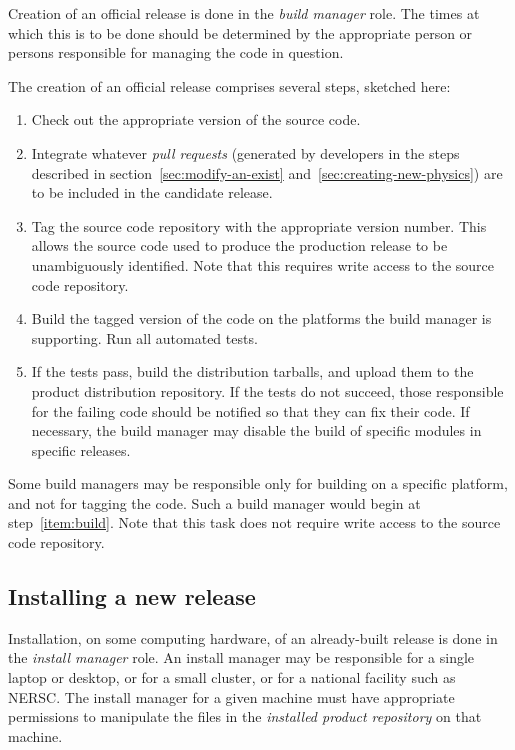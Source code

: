 \documentclass{memarticle}
\begin{document}
Creation of an official release is done in the \emph{build manager}
role. The times at which this is to be done should be determined by the
appropriate person or persons responsible for managing the code in
question.

The creation of an official release comprises several steps, sketched
here:
\begin{enumerate}
\item Check out the appropriate version of the source code.
\item Integrate whatever \emph{pull requests} (generated by developers
  in the steps described in
  section~\ref{sec:modify-an-exist}
  and~\ref{sec:creating-new-physics}) are to be included in the
  candidate release.
\item Tag the source code repository with the appropriate version
  number. This allows the source code used to produce the production
  release to be unambiguously identified. Note that this requires write
  access to the source code repository.
\item \label{item:build} Build the tagged version of the code on the
  platforms the build manager is supporting. Run all automated tests.
\item If the tests pass, build the distribution tarballs, and upload
  them to the product distribution repository. If the tests do not
  succeed, those responsible for the failing code should be notified so
  that they can fix their code. If necessary, the build manager may
  disable the build of specific modules in specific releases.
\end{enumerate}

Some build managers may be responsible only for building on a specific
platform, and not for tagging the code. Such a build manager would begin
at step~\ref{item:build}. Note that this task does not require write
access to the source code repository.

\subsection{Installing a new release}

Installation, on some computing hardware, of an already-built release is
done in the \emph{install manager} role. An install manager may be
responsible for a single laptop or desktop, or for a small cluster, or
for a national facility such as NERSC. The install manager for a given
machine must have appropriate permissions to manipulate the files in the
\emph{installed product repository} on that machine.
\end{document}
